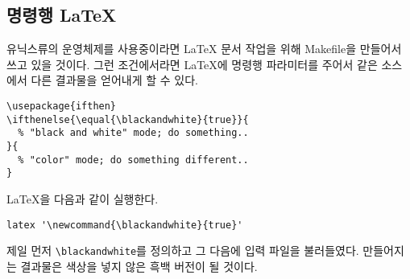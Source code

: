 \subsection{명령행 \LaTeX}

유닉스류의 운영체제를 사용중이라면 \LaTeX{} 문서 작업을 위해 Makefile을 만들어서 쓰고 있을 것이다. 그런 조건에서라면 \LaTeX 에 명령행 파라미터를 주어서 같은 소스에서 다른 결과물을 얻어내게 할 수 있다.%

\begin{verbatim}
\usepackage{ifthen}
\ifthenelse{\equal{\blackandwhite}{true}}{
  % "black and white" mode; do something..
}{
  % "color" mode; do something different..
}
\end{verbatim}

\LaTeX 을 다음과 같이 실행한다.
\begin{verbatim}
latex '\newcommand{\blackandwhite}{true}'
\end{verbatim}

제일 먼저 \verb|\blackandwhite|를 정의하고 그 다음에 입력 파일을 불러들였다. 
만들어지는 결과물은 색상을 넣지 않은 흑백 버전이 될 것이다.

